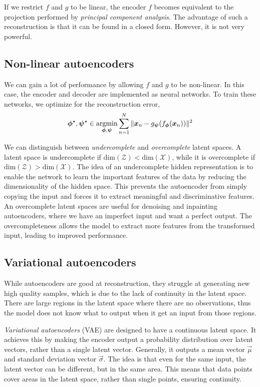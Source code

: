 If we restrict $f$ and $g$ to be linear, the encoder $f$ becomes equivalent to the projection
performed by \textit{principal component analysis}. The advantage of such a reconstruction is that
it can be found in a closed form. However, it is not very powerful.

\subsection{Non-linear autoencoders}

We can gain a lot of performance by allowing $f$ and $g$ to be non-linear. In this case, the
encoder and decoder are implemented as neural networks. To train these networks, we optimize for
the reconstruction error, \[
    \bm{\phi}^\star, \bm{\psi}^\star \in \operatorname*{argmin}_{\bm{\phi}, \bm{\psi}} \sum_{n=1}^{N} \| \bm{x}_n - g_{\bm{\psi}} (f_{\bm{\phi}}(\bm{x}_n)) \|^2
\]

We can distinguish between \textit{undercomplete} and \textit{overcomplete} latent spaces. A latent
space is undercomplete if $\mathrm{dim}(\mathcal{Z}) < \mathrm{dim}(\mathcal{X})$, while it is
overcomplete if $\mathrm{dim}(\mathcal{Z}) > \mathrm{dim}(\mathcal{X})$. The idea of an
undercomplete hidden representation is to enable the network to learn the important features of the
data by reducing the dimensionality of the hidden space. This prevents the autoencoder from simply
copying the input and forces it to extract meaningful and discriminative features. An overcomplete
latent spaces are useful for denoising and inpainting autoencoders, where we have an imperfect
input and want a perfect output. The overcompleteness allows the model to extract more features
from the transformed input, leading to improved performance.

\subsection{Variational autoencoders}

While autoencoders are good at reconstruction, they struggle at generating new high quality
samples, which is due to the lack of continuity in the latent space. There are large regions in the
latent space where there are no observations, thus the model does not know what to output when it
get an input from those regions.

\textit{Variational autoencoders} (VAE) are designed to have a continuous latent space. It achieves
this by making the encoder output a probability distribution over latent vectors, rather than a
single latent vector. Generally, it outputs a mean vector $\vec{\mu}$ and standard deviation vector
$\vec{\sigma}$. The idea is that even for the same input, the latent vector can be different, but in
the same area. This means that data points cover areas in the latent space, rather than single
points, ensuring continuity.

